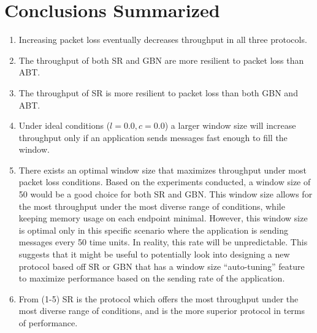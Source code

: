\documentclass{article}
\begin{document}
\pagebreak

\section{Conclusions Summarized}
\begin{enumerate}
    \item Increasing packet loss eventually decreases throughput in all three protocols.
    \item The throughput of both SR and GBN are more resilient to packet loss than ABT.
    \item The throughput of SR is more resilient to packet loss than both GBN and ABT.
    \item Under ideal conditions ($l=0.0, c=0.0$) a larger window size will increase throughput only if an application sends messages fast enough to fill the window.
    \item There exists an optimal window size that maximizes throughput under most packet loss conditions. Based on the experiments conducted, a window size of 50 would be a good choice for both SR and GBN. This window size allows for the most throughput under the most diverse range of conditions, while keeping memory usage on each endpoint minimal. However, this window size is optimal only in this specific scenario where the application is sending messages every 50 time units. In reality, this rate will be unpredictable. This suggests that it might be useful to potentially look into designing a new protocol based off SR or GBN that has a window size ``auto-tuning'' feature to maximize performance based on the sending rate of the application.
    \item From (1-5) SR is the protocol which offers the most throughput under the most diverse range of conditions, and is the more superior protocol in terms of performance.
\end{enumerate}
\end{document}
